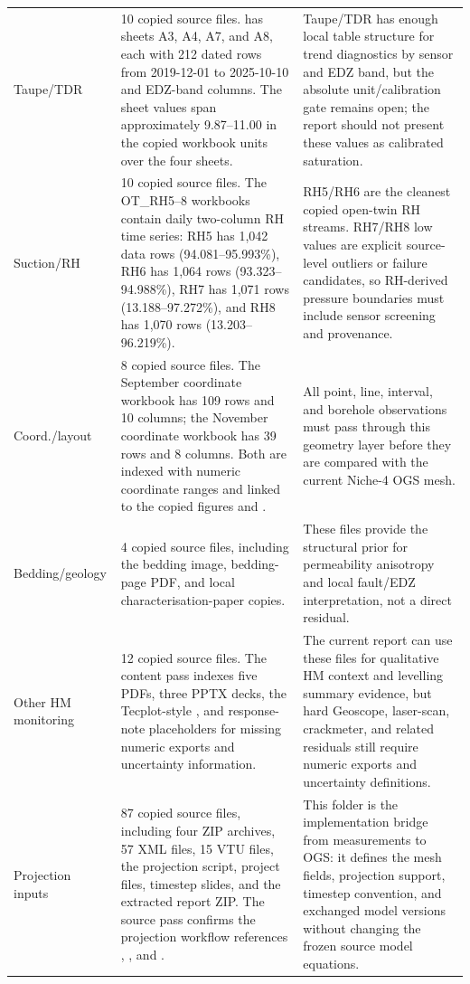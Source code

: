 \begin{longtable}{P{2.7cm} P{6.1cm} P{6.6cm}}
Taupe/TDR &
10 copied source files.   has sheets A3, A4, A7, and A8,
each with 212 dated rows from 2019-12-01 to 2025-10-10 and EDZ-band columns.
The sheet values span approximately 9.87--11.00 in the copied workbook units over
the four sheets. &
Taupe/TDR has enough local table structure for trend diagnostics by sensor and EDZ
band, but the absolute unit/calibration gate remains open; the report should not
present these values as calibrated saturation.\\

Suction/RH &
10 copied source files.  The OT\_RH5--8 workbooks contain daily two-column RH
time series: RH5 has 1,042 data rows (94.081--95.993\%), RH6 has 1,064 rows
(93.323--94.988\%), RH7 has 1,071 rows (13.188--97.272\%), and RH8 has
1,070 rows (13.203--96.219\%). &
RH5/RH6 are the cleanest copied open-twin RH streams.  RH7/RH8 low values are
explicit source-level outliers or failure candidates, so RH-derived pressure
boundaries must include sensor screening and provenance.\\

Coord./layout &
8 copied source files.  The September coordinate workbook has 109 rows and 10
columns; the November coordinate workbook has 39 rows and 8 columns.  Both are
indexed with numeric coordinate ranges and linked to the copied figures and
. &
All point, line, interval, and borehole observations must pass through this
geometry layer before they are compared with the current Niche-4 OGS mesh.\\

Bedding/geology &
4 copied source files, including the bedding image, bedding-page PDF, and local
characterisation-paper copies. &
These files provide the structural prior for permeability anisotropy and local
fault/EDZ interpretation, not a direct residual.\\

Other HM monitoring &
12 copied source files.  The content pass indexes five PDFs, three PPTX decks,
the Tecplot-style , and response-note placeholders for
missing numeric exports and uncertainty information. &
The current report can use these files for qualitative HM context and levelling
summary evidence, but hard Geoscope, laser-scan, crackmeter, and related residuals
still require numeric exports and uncertainty definitions.\\

Projection inputs &
87 copied source files, including four ZIP archives, 57 XML files, 15 VTU files,
the projection script, project files, timestep slides, and the extracted report ZIP.
The source pass confirms the projection workflow references
, , and
. &
This folder is the implementation bridge from measurements to OGS: it defines the
mesh fields, projection support, timestep convention, and exchanged model versions
without changing the frozen source model equations.\\
\end{longtable}


